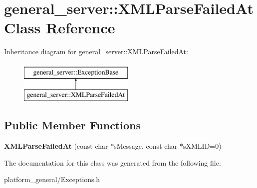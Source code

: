 \hypertarget{classgeneral__server_1_1XMLParseFailedAt}{\section{general\-\_\-server\-:\-:\-X\-M\-L\-Parse\-Failed\-At \-Class \-Reference}
\label{classgeneral__server_1_1XMLParseFailedAt}
}
\-Inheritance diagram for general\-\_\-server\-:\-:\-X\-M\-L\-Parse\-Failed\-At\-:\begin{figure}[H]
\begin{center}
\leavevmode
\includegraphics[height=2.000000cm]{classgeneral__server_1_1XMLParseFailedAt}
\end{center}
\end{figure}
\subsection*{\-Public \-Member \-Functions}
\begin{DoxyCompactItemize}
\item 
\hypertarget{classgeneral__server_1_1XMLParseFailedAt_a15195f2c4698af485099b9b3599f441f}{{\bfseries \-X\-M\-L\-Parse\-Failed\-At} (const char $\ast$s\-Message, const char $\ast$s\-X\-M\-L\-I\-D=0)}\label{classgeneral__server_1_1XMLParseFailedAt_a15195f2c4698af485099b9b3599f441f}

\end{DoxyCompactItemize}


\-The documentation for this class was generated from the following file\-:\begin{DoxyCompactItemize}
\item 
platform\-\_\-general/\-Exceptions.\-h\end{DoxyCompactItemize}
